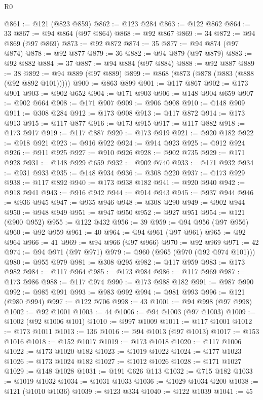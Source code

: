 \begin{lexlean}{R0}
\begin{coremodule}
@861 := @121 (@823 @859)
@862 := @123 @284
@863 := @122 @862
@864 := 33
@867 := @94 @864 (@97 @864)
@868 := @92 @867
@869 := 34
@872 := @94 @869 (@97 @869)
@873 := @92 @872
@874 := 35
@877 := @94 @874 (@97 @874)
@878 := @92 @877
@879 := 36
@882 := @94 @879 (@97 @879)
@883 := @92 @882
@884 := 37
@887 := @94 @884 (@97 @884)
@888 := @92 @887
@889 := 38
@892 := @94 @889 (@97 @889)
@899 := @868 (@873 (@878 (@883 (@888 (@92 @892 @101)))))
@900 := @863 @899
@901 := @117 @867
@902 := @173 @901
@903 := @902 @652
@904 := @171 @903
@906 := @148 @904 @659
@907 := @902 @664
@908 := @171 @907
@909 := @906 @908
@910 := @148 @909
@911 := @308 @284
@912 := @173 @908
@913 := @117 @872
@914 := @173 @913
@915 := @117 @877
@916 := @173 @915
@917 := @117 @882
@918 := @173 @917
@919 := @117 @887
@920 := @173 @919
@921 := @920 @182
@922 := @918 @921
@923 := @916 @922
@924 := @914 @923
@925 := @912 @924
@926 := @911 @925
@927 := @910 @926
@928 := @902 @735
@929 := @171 @928
@931 := @148 @929 @659
@932 := @902 @740
@933 := @171 @932
@934 := @931 @933
@935 := @148 @934
@936 := @308 @220
@937 := @173 @929
@938 := @117 @892
@940 := @173 @938 @182
@941 := @920 @940
@942 := @918 @941
@943 := @916 @942
@944 := @914 @943
@945 := @937 @944
@946 := @936 @945
@947 := @935 @946
@948 := @308 @290
@949 := @902 @944
@950 := @948 @949
@951 := @947 @950
@952 := @927 @951
@954 := @121 (@900 @952)
@955 := @122 @432
@956 := 39
@959 := @94 @956 (@97 @956)
@960 := @92 @959
@961 := 40
@964 := @94 @961 (@97 @961)
@965 := @92 @964
@966 := 41
@969 := @94 @966 (@97 @966)
@970 := @92 @969
@971 := 42
@974 := @94 @971 (@97 @971)
@979 := @960 (@965 (@970 (@92 @974 @101)))
@980 := @955 @979
@981 := @308 @295
@982 := @117 @959
@983 := @173 @982
@984 := @117 @964
@985 := @173 @984
@986 := @117 @969
@987 := @173 @986
@988 := @117 @974
@990 := @173 @988 @182
@991 := @987 @990
@992 := @985 @991
@993 := @983 @992
@994 := @981 @993
@996 := @121 (@980 @994)
@997 := @122 @706
@998 := 43
@1001 := @94 @998 (@97 @998)
@1002 := @92 @1001
@1003 := 44
@1006 := @94 @1003 (@97 @1003)
@1009 := @1002 (@92 @1006 @101)
@1010 := @997 @1009
@1011 := @117 @1001
@1012 := @173 @1011
@1013 := 136
@1016 := @94 @1013 (@97 @1013)
@1017 := @153 @1016
@1018 := @152 @1017
@1019 := @173 @1018
@1020 := @117 @1006
@1022 := @173 @1020 @182
@1023 := @1019 @1022
@1024 := @177 @1023
@1026 := @173 @1024 @182
@1027 := @1012 @1026
@1028 := @171 @1027
@1029 := @148 @1028
@1031 := @191 @626 @113
@1032 := @715 @182
@1033 := @1019 @1032
@1034 := @1031 @1033
@1036 := @1029 @1034 @200
@1038 := @121 (@1010 @1036)
@1039 := @123 @334
@1040 := @122 @1039
@1041 := 45

\end{coremodule}
\end{lexlean}
